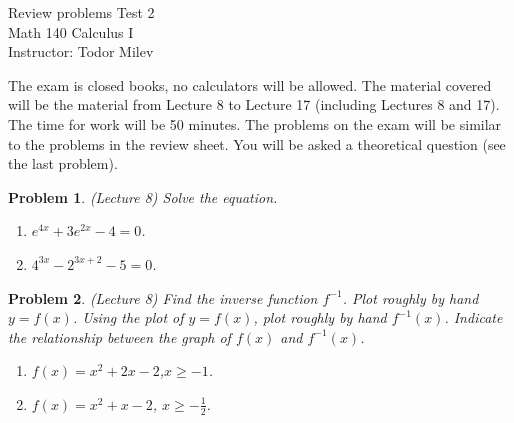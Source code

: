 \documentclass{article}
\newtheorem{problem}{Problem}
\begin{document}
\begin{center}
\Large
Review problems Test 2\\ Math 140 Calculus I \\ \normalsize Instructor: Todor Milev
\end{center}


\noindent The exam is closed books, no calculators will be allowed. The material covered will be the material from Lecture 8 to Lecture 17 (including Lectures 8 and 17). The time for work will be 50 minutes. The problems on the exam will be similar to the problems in the review sheet. You will be asked a theoretical question (see the last problem).
\begin{problem}(Lecture 8)
Solve the equation.
\begin{enumerate}
\item $e^{4x}+3e^{2x}-4=0$. 
\item $4^{3x}-2^{3x+2}-5=0$. 
\end{enumerate}
\end{problem}
\begin{problem}(Lecture 8)
Find the inverse function $f^{-1}$. Plot roughly by hand $y=f(x)$. Using the plot of $y=f(x)$, plot roughly by hand $f^{-1}(x)$. Indicate the relationship between the graph of $f(x)$ and $f^{-1}(x)$.
\begin{enumerate}
\item $f(x)= x^2+2x-2$,\quad \quad \quad $ x\geq -1$. 
\item $f(x)= x^2+x-2$, \quad \quad \quad $ x\geq -\frac{1}{2}$.

\end{enumerate}
\end{problem}
\end{document}
